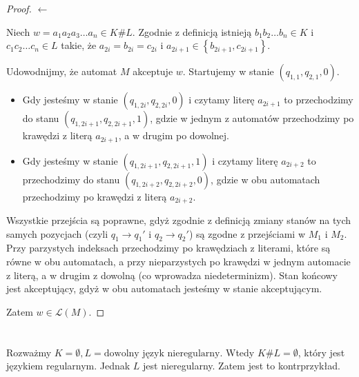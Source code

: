 \documentclass{article}
\theoremstyle{definition}
\theoremstyle{remark}
\begin{document}
\begin{proof}
    \(\leftarrow\)

    Niech \(w = a_1 a_2 a_3\ldots a_n \in K \# L\). Zgodnie z definicją istnieją \(b_1 b_2 \ldots b_n \in K\) i \(c_1 c_2 \ldots c_n \in L\) takie, że \(a_{2i} = b_{2i} = c_{2i}\) i \(a_{2i+1} \in \left\{ b_{2i+1}, c_{2i+1} \right\}\).
    
    
    Udowodnijmy, że automat \(M\) akceptuje \(w\). Startujemy w stanie \(\left(q_{1,1}, q_{2,1}, 0 \right)\).
    \begin{itemize}
        \item Gdy jesteśmy w stanie \(\left(q_{1,2i}, q_{2,2i}, 0 \right)\) i czytamy literę \(a_{2i+1}\)
        to przechodzimy do stanu \(\left(q_{1,2i+1}, q_{2,2i+1}, 1 \right)\),
        gdzie w jednym z automatów przechodzimy po krawędzi z literą \(a_{2i+1}\), a w drugim po dowolnej.
        \item Gdy jesteśmy w stanie \(\left(q_{1,2i+1}, q_{2,2i+1}, 1 \right)\) i czytamy literę \(a_{2i+2}\)
        to przechodzimy do stanu \(\left(q_{1,2i+2}, q_{2,2i+2}, 0 \right)\), gdzie w obu automatach przechodzimy po krawędzi z literą \(a_{2i+2}\).
    \end{itemize}

    Wszystkie przejścia są poprawne, gdyż zgodnie z definicją zmiany stanów na tych samych pozycjach (czyli \(q_1 \rightarrow q_1'\) i \(q_2 \rightarrow q_2'\))
    są zgodne z przejściami w \(M_1\) i \(M_2\).
    Przy parzystych indeksach przechodzimy po krawędziach z literami, które są równe w obu automatach,
    a przy nieparzystych po krawędzi w jednym automacie z literą, a w drugim z dowolną (co wprowadza niedeterminizm).
    Stan końcowy jest akceptujący, gdyż w obu automatach jesteśmy w stanie akceptującym.

    Zatem \(w \in \mathcal{L}(M)\).
\end{proof}

\section{}

Rozważmy \(K = \emptyset, L = \text{dowolny język nieregularny}\). Wtedy
\(K \# L = \emptyset\), który jest językiem regularnym. Jednak \(L\)
jest nieregularny. Zatem jest to kontrprzykład.

\section{}
\end{document}

